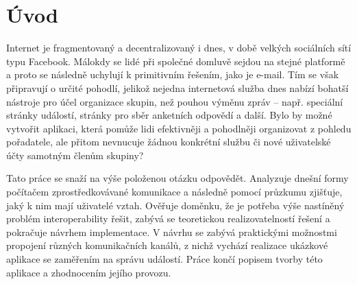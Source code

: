 \documentclass[12pt,oneside,final]{fithesis2}
\begin{document}
\FrontMatter
\ThesisTitlePage



\begin{ThesisDeclaration}
\DeclarationText
\AdvisorName
\end{ThesisDeclaration}












\tableofcontents



\MainMatter






\chapter{Úvod}
Internet je fragmentovaný a decentralizovaný i dnes, v době velkých sociálních sítí typu Facebook. Málokdy se lidé při společné domluvě sejdou na stejné platformě a proto se následně uchylují k primitivním řešením, jako je e-mail. Tím se však připravují o určité pohodlí, jelikož nejedna internetová služba dnes nabízí bohatší nástroje pro účel organizace skupin, než pouhou výměnu zpráv -- např. speciální stránky událostí, stránky pro sběr anketních odpovědí a další. Bylo by možné vytvořit aplikaci, která pomůže lidi efektivněji a pohodlněji organizovat z pohledu pořadatele, ale přitom nevnucuje žádnou konkrétní službu či nové uživatelské účty samotným členům skupiny?

Tato práce se snaží na výše položenou otázku odpovědět. Analyzuje dnešní formy počítačem zprostředkovávané komunikace a následně pomocí průzkumu zjišťuje, jaký k nim mají uživatelé vztah. Ověřuje doměnku, že je potřeba výše nastíněný problém interoperability řešit, zabývá se teoretickou realizovatelností řešení a pokračuje návrhem implementace. V návrhu se zabývá praktickými možnostmi propojení různých komunikačních kanálů, z nichž vychází realizace ukázkové aplikace se zaměřením na správu událostí. Práce končí popisem tvorby této aplikace a zhodnocením jejího provozu.
\end{document}
